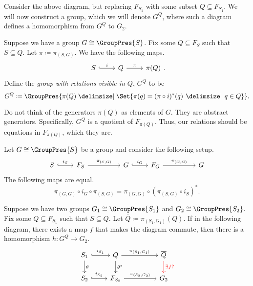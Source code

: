 Consider the above diagram, but replacing $F_{S_1}$ with some subset $Q \subseteq F_{S_1}$. We will now construct a group, which we will denote $G^Q$, where such a diagram defines a homomorphism from $G^Q$ to $G_2$.

 \begin{definition}
	 Suppose we have a group $G \cong \GroupPres{S}$.
	 Fix some $Q \subseteq F_S$ such that $S \subseteq Q$.
	 Let $\pi \coloneq \pi_{(S,G)}$.
	 We have the following maps.
	 \[
	 \begin{tikzcd}
		 S \ar[r, hook, "i"] & Q \ar[r, "\pi"] & \pi(Q)
	 \end{tikzcd}
	 .\]
	 Define the \emph{group with relations visible in $Q$}, $G^Q$ to be  
	 \[
		 G^Q \coloneqq \GroupPres{\pi(Q) \relations \Set{\pi(q) = (\pi \circ i)^*(q) \given q \in Q} }
	 .\]
	 \label{def:G_Q}
\end{definition}
\begin{remark}
	Do not think of  the generators $\pi(Q)$ as elements of $G$.
	They are abstract generators.
	Specifically,  $G^Q$ is a quotient of  $F_{\pi(Q)}$.
	Thus, our relations should be equations in $F_{\pi(Q)}$, which they are.
\end{remark}
\begin{lemma}
	Let $G \cong \GroupPres{S}$ be a group and consider the following setup.
	\[
	\begin{tikzcd}
		S \ar[r, hook, "i_S"] & F_S \ar[rr, "\pi_{(S,G)}"] & & G \ar[r, hook, "i_G"] & F_G \ar[rr, "\pi_{(G,G)}"] & & G
	\end{tikzcd}
	\]
	The following maps are equal.
	\[
		\pi_{(G,G)} \circ i_G \circ \pi_{(S,G)} = \pi_{(G,G)} \circ (\pi_{(S,G)} \circ i_S)^*
	.\]
	\label{lem:group_projections}
\end{lemma}
\begin{theorem}
	Suppose we have two groups $G_1 \cong \GroupPres{S_1}$ and $G_2 \cong \GroupPres{S_2}$.
	Fix some $Q \subseteq F_{S_1}$ such that  $S \subseteq Q$.
	Let $\overline{Q} \coloneqq \pi_{(S_1, G_1)}(Q) $.
	If in the following diagram, there exists a map $f$ that makes the diagram commute, then there is a homomorphism $h \colon G^Q \to G_2$.
	\[
		\begin{tikzcd}
			S_1 \ar[d, "\theta"] \ar[r, hook, "i_{S_1}"] & Q \ar[d, "\theta^*"] \ar[rr, "\pi_{(S_1,G_1)}"] & & \overline{Q} \ar[d, color=red, "\exists f ?"] \\
			S_2 \ar[r, hook, "i_{S_2}"] & F_{S_2} \ar[rr, "\pi_{(S_2,G_2)}"] & & G_2 
		\end{tikzcd}
		\]
\end{theorem}
